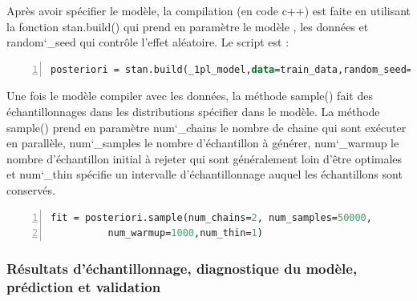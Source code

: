 Après avoir spécifier le modèle, la compilation (en code c++) est faite en utilisant la fonction \colorbox{gray!30}{stan.build()} qui prend en paramètre le modèle , les données et random\char`_seed qui contrôle l’effet aléatoire. Le script est :
\begin{lstlisting}[language=Stan,basicstyle=\normalsize, frame=l,framesep=4.5mm,framexleftmargin=2.5mm,tabsize=2,numbers=left,fillcolor=\color{blueforest!70},rulecolor=\color{blueforest},numberstyle=\normalsize\tiny\color{white}]
	posteriori = stan.build(_1pl_model,data=train_data,random_seed=2021)
\end{lstlisting}

Une fois le modèle compiler avec les données, la méthode \colorbox{gray!30}{sample()} fait des échantillonnages dans les distributions spécifier dans le modèle. La méthode \colorbox{gray!30}{sample()} prend en paramètre \colorbox{gray!30}{num\char`_chains}   le nombre de chaine  qui sont exécuter en parallèle, \colorbox{gray!30}{num\char`_samples}  le nombre d’échantillon à générer, \colorbox{gray!30}{num\char`_warmup}  le nombre d’échantillon initial à rejeter qui sont généralement loin d'être optimales et \colorbox{gray!30}{num\char`_thin} spécifie un intervalle d'échantillonnage auquel les échantillons sont conservés.

\begin{lstlisting}[language=Stan,basicstyle=\normalsize, frame=l,framesep=4.5mm,framexleftmargin=2.5mm,tabsize=2,numbers=left,fillcolor=\color{blueforest!70},rulecolor=\color{blueforest},numberstyle=\normalsize\tiny\color{white}]
	fit = posteriori.sample(num_chains=2, num_samples=50000,
	      num_warmup=1000,num_thin=1)
\end{lstlisting}



\subsubsection{Résultats d’échantillonnage, diagnostique du modèle, prédiction et validation}



